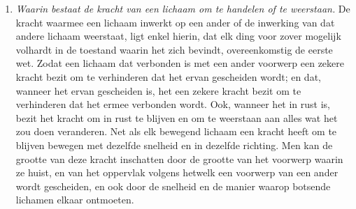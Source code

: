{\begin{enumerate}
\item[]\textit{Waarin bestaat de kracht van een lichaam om te handelen of te weerstaan.} De kracht waarmee een lichaam inwerkt op een ander of de inwerking van dat andere lichaam weerstaat, ligt enkel hierin, dat elk ding voor zover mogelijk volhardt in de toestand waarin het zich bevindt, overeenkomstig de eerste wet. Zodat een lichaam dat verbonden is met een ander voorwerp een zekere kracht bezit om te verhinderen dat het ervan gescheiden wordt; en dat, wanneer het ervan gescheiden is, het een zekere kracht bezit om te verhinderen dat het ermee verbonden wordt. Ook, wanneer het in rust is, bezit het kracht om in rust te blijven en om te weerstaan aan alles wat het zou doen veranderen. Net als elk bewegend lichaam een kracht heeft om te blijven bewegen met dezelfde snelheid en in dezelfde richting. Men kan de grootte van deze kracht inschatten door de grootte van het voorwerp waarin ze huist, en van het oppervlak volgens hetwelk een voorwerp van een ander wordt gescheiden, en ook door de snelheid en de manier waarop botsende lichamen elkaar ontmoeten.

\end{enumerate}

}


